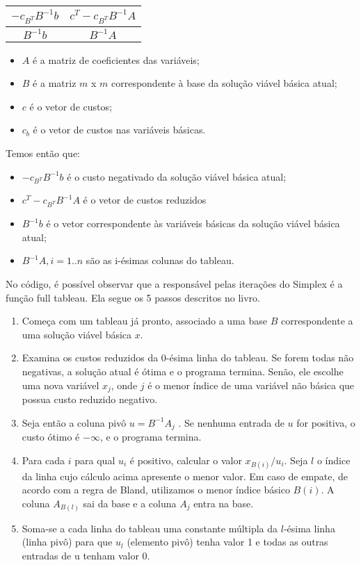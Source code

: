 \documentclass[brazil,times]{abnt}
\begin{document}
\begin{center}
  \begin{tabular}{ | c | c | }
    \hline
    $-c_{B^T}B^{-1}b$ & $c^T - c_{B^T}B^{-1}A$ \\ \hline
    $B^{-1}b$ & $B^{-1}A$ \\ \hline
  \end{tabular}
\end{center}

\begin{itemize}
	\item[] $A$ é a matriz de coeficientes das variáveis;
	\item[] $B$ é a matriz $m$ x $m$ correspondente à base da solução viável básica atual;
	\item[] $c$ é o vetor de custos;
	\item[] $c_b$ é o vetor de custos nas variáveis básicas.
\end{itemize}

Temos então que:

\begin{itemize}
	\item[] $-c_{B^T}B^{-1}b$ é o custo negativado da solução viável básica atual;
	\item[] $c^T - c_{B^T}B^{-1}A$ é o vetor de custos reduzidos
	\item[] $B^{-1}b$ é o vetor correspondente às variáveis básicas da solução viável básica atual;
	\item[] $B^{-1}A, i = 1..n$  são as i-ésimas colunas do tableau.
\end{itemize}

No código, é possível observar que a responsável pelas iterações do Simplex é a função full tableau. Ela segue os 5 passos descritos no livro.

\begin{enumerate}
	\item Começa com um tableau já pronto, associado a uma base $B$ correspondente a uma solução viável básica $x$.
	\item Examina os custos reduzidos da 0-ésima linha do tableau. Se forem todas não negativas, a solução atual é ótima e o programa termina. Senão, ele escolhe uma nova variável $x_j$, onde $j$ é o menor índice de uma variável não básica que possua custo reduzido negativo.
	\item Seja então a coluna pivô $u = B^{-1}A_j$ . Se nenhuma entrada de $u$ for positiva, o custo ótimo é $-\infty$, e o programa termina.
	\item Para cada $i$ para qual $u_i$ é positivo, calcular o valor $x_{B(i)}/u_i$. Seja $l$ o índice da linha cujo cálculo acima apresente o menor valor. Em caso de empate, de acordo com a regra de Bland, utilizamos o menor índice básico $B(i)$. A coluna $A_{B(l)}$ sai da base e a coluna $A_j$ entra na base.
	\item Soma-se a cada linha do tableau uma constante múltipla da $l$-ésima linha (linha pivô) para que $u_l$ (elemento pivô) tenha valor 1 e todas as outras entradas de u tenham valor 0.
\end{enumerate}
\end{document}
